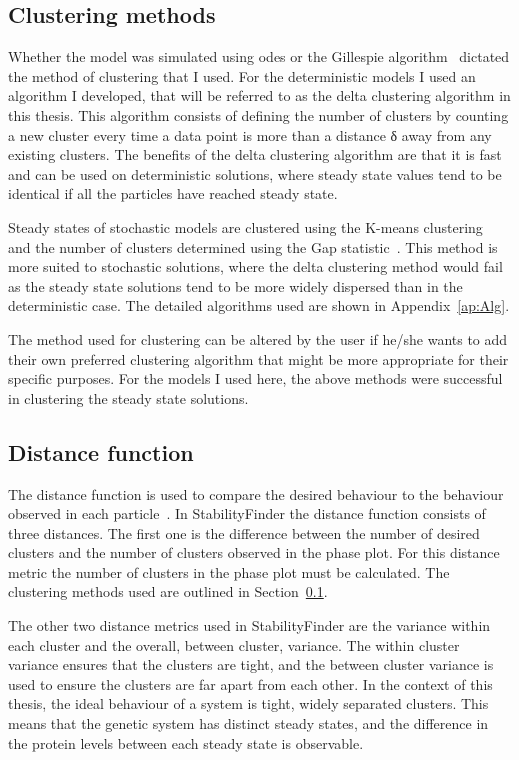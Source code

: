 \subsection{Clustering methods}
\label{Clustering methods}

Whether the model was simulated using \acrshort{ode}s or the Gillespie algorithm~\autocite{Gillespie:1977ww} dictated the method of clustering that I used. For the deterministic models I used an algorithm I developed, that will be referred to as the delta clustering algorithm in this thesis. This algorithm consists of defining the number of clusters by counting a new cluster every time a data point is more than a distance δ away from any existing clusters. The benefits of the delta clustering algorithm are that it is fast and can be used on deterministic solutions, where steady state values tend to be identical if all the particles have reached steady state.

Steady states of stochastic models are clustered using the K-means clustering~\autocite{Lloyd:1982wn} and the number of clusters determined using the Gap statistic~\autocite{Tibshirani:2001vo}. This method is more suited to stochastic solutions, where the delta clustering method would fail as the steady state solutions tend to be more widely dispersed than in the deterministic case. The detailed algorithms used are shown in Appendix~\ref{ap:Alg}. 

The method used for clustering can be altered by the user if he/she wants to add their own preferred clustering algorithm that might be more appropriate for their specific purposes. For the models I used here, the above methods were successful in clustering the steady state solutions. 

\subsection{Distance function}
\label{sec:dist}
 The distance function is used to compare the desired behaviour to the behaviour observed in each particle~\autocite{Toni:2009tr}. In StabilityFinder the distance function consists of three distances. The first one is the difference between the number of desired clusters and the number of clusters observed in the phase plot. For this distance metric the number of clusters in the phase plot must be calculated. The clustering methods used are outlined in Section~\ref{Clustering methods}.
 
 The other two distance metrics used in StabilityFinder are the variance within each cluster and the overall, between cluster, variance. The within cluster variance ensures that the clusters are tight, and the between cluster variance is used to ensure the clusters are far apart from each other. In the context of this thesis, the ideal behaviour of a system is tight, widely separated clusters. This means that the genetic system has distinct steady states, and the difference in the protein levels between each steady state is observable.

